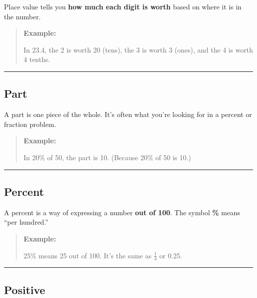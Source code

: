 \documentclass[
  letterpaper,
  DIV=11,
  numbers=noendperiod]{scrreprt}
\begin{document}
Place value tells you \textbf{how much each digit is worth} based on
where it is in the number.

\begin{quote}
\textbf{Example:}

In 23.4, the 2 is worth 20 (tens), the 3 is worth 3 (ones), and the 4 is
worth 4 tenths.
\end{quote}

\begin{center}\rule{0.5\linewidth}{0.5pt}\end{center}

\subsection*{Part}\label{glossary-part}

A part is one piece of the whole. It's often what you're looking for in
a percent or fraction problem.

\begin{quote}
\textbf{Example:}

In 20\% of 50, the part is 10. (Because 20\% of 50 is 10.)
\end{quote}

\begin{center}\rule{0.5\linewidth}{0.5pt}\end{center}

\subsection*{Percent}\label{glossary-percent}

A percent is a way of expressing a number \textbf{out of 100}. The
symbol \textbf{\%} means ``per hundred.''

\begin{quote}
\textbf{Example:}

25\% means 25 out of 100. It's the same as \(\frac{1}{4}\) or 0.25.
\end{quote}

\begin{center}\rule{0.5\linewidth}{0.5pt}\end{center}

\subsection*{Positive}\label{glossary-positive}
\end{document}
